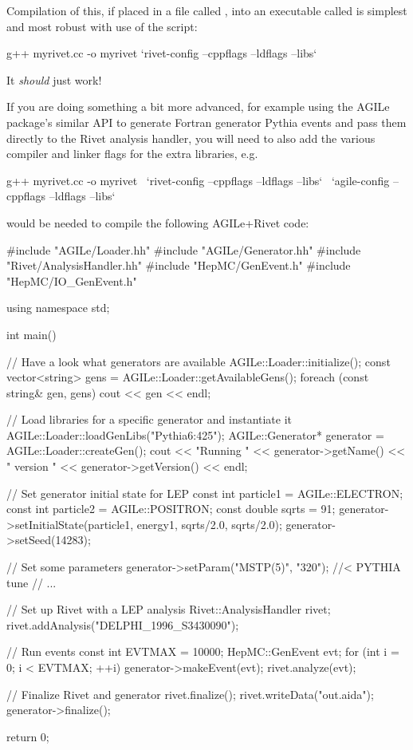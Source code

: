 Compilation of this, if placed in a file called , into an
executable called  is simplest and most robust with use of the
 script:
%
\begin{snippet}
g++ myrivet.cc -o myrivet `rivet-config --cppflags --ldflags --libs`
\end{snippet}
%
It \emph{should} just work!

If you are doing something a bit more advanced, for example using the AGILe
package's similar API to generate Fortran generator Pythia events and pass them
directly to the Rivet analysis handler, you will need to also add the various
compiler and linker flags for the extra libraries, e.g.
%
\begin{snippet}
g++ myrivet.cc -o myrivet \
  `rivet-config --cppflags --ldflags --libs` \
  `agile-config --cppflags --ldflags --libs`
\end{snippet}
%
would be needed to compile the following AGILe+Rivet code:
%
\goodbreak
\begin{snippet}
#include "AGILe/Loader.hh"
#include "AGILe/Generator.hh"
#include "Rivet/AnalysisHandler.hh"
#include "HepMC/GenEvent.h"
#include "HepMC/IO_GenEvent.h"

using namespace std;

int main() {
  // Have a look what generators are available
  AGILe::Loader::initialize();
  const vector<string> gens = AGILe::Loader::getAvailableGens();
  foreach (const string& gen, gens) {
    cout << gen << endl;
  }

  // Load libraries for a specific generator and instantiate it
  AGILe::Loader::loadGenLibs("Pythia6:425");
  AGILe::Generator* generator = AGILe::Loader::createGen();
  cout << "Running " << generator->getName()
       << " version " << generator->getVersion() << endl;

  // Set generator initial state for LEP
  const int particle1 = AGILe::ELECTRON;
  const int particle2 = AGILe::POSITRON;
  const double sqrts = 91;
  generator->setInitialState(particle1, energy1, sqrts/2.0, sqrts/2.0);
  generator->setSeed(14283);

  // Set some parameters
  generator->setParam("MSTP(5)", "320"); //< PYTHIA tune
  // ...

  // Set up Rivet with a LEP analysis
  Rivet::AnalysisHandler rivet;
  rivet.addAnalysis("DELPHI_1996_S3430090");

  // Run events
  const int EVTMAX = 10000;
  HepMC::GenEvent evt;
  for (int i = 0; i < EVTMAX; ++i) {
    generator->makeEvent(evt);
    rivet.analyze(evt);
  }

  // Finalize Rivet and generator
  rivet.finalize();
  rivet.writeData("out.aida");
  generator->finalize();

  return 0;
}
\end{snippet}


